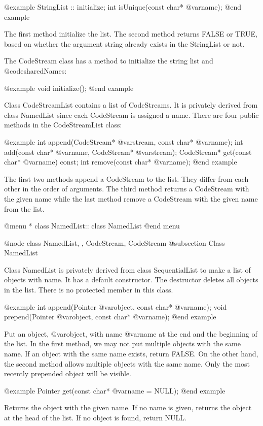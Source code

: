@example
StringList :: initialize;
int isUnique(const char* @var{name});
@end example

The first method initialize the list. The second method returns FALSE or TRUE,
based on whether the argument string already exists in the StringList or not.

The CodeStream class has a method to initialize the string list and
@code{sharedNames}:

@example
void initialize();
@end example

Class CodeStreamList contains a list of CodeStreams. It is privately
derived from class NamedList since each CodeStream is assigned a name. 
There are four public methods in the CodeStreamList class:

@example
int append(CodeStream* @var{stream}, const char* @var{name});
int add(const char* @var{name}, CodeStream* @var{stream});
CodeStream* get(const char* @var{name}) const;
int remove(const char* @var{name});
@end example

The first two methods append a CodeStream to the list. They differ from
each other in the order of arguments. The third method returns a CodeStream
with the given name while the last method remove a CodeStream with the
given name from the list.

@menu
* class NamedList::			class NamedList
@end menu

@node class NamedList, , CodeStream, CodeStream
@subsection Class NamedList

Class NamedList is privately derived from class SequentialList to make
a list of objects with name. It has a default constructor. The destructor
deletes all objects in the list. There is no protected member in this class.

@example
int append(Pointer @var{object}, const char* @var{name});
void prepend(Pointer @var{object}, const char* @var{name});
@end example

Put an object, @var{object}, with name @var{name} at the end and the
beginning of the list. In the first method, we may not put multiple
objects with the same name. If an object with the same name exists, return
FALSE. On the other hand, the second method allows multiple objects with
the same name. Only the most recently prepended object will be visible.

@example
Pointer get(const char* @var{name} = NULL);
@end example

Returns the object with the given name. If no name is given, returns the
object at the head of the list. If no object is found, return NULL.

